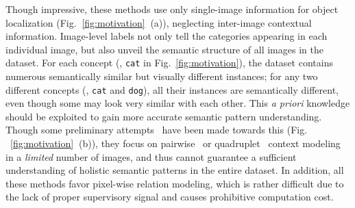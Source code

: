 \documentclass[10pt,twocolumn,letterpaper]{article}
\begin{document}
Though impressive, these methods use only single-image information for object localization (Fig.$_{\!\!}$~\ref{fig:motivation}$_{\!\!}$~(a)), neglecting inter-image contextual information. Image-level labels not only tell the categories appearing in each individual image, but also  unveil the semantic structure  of all images in the dataset. For each concept (\ie, \texttt{cat} in Fig.~\ref{fig:motivation}), the dataset contains numerous semantically similar but visually different instances; for any two different concepts (\eg, \texttt{cat} and \texttt{dog}), all their instances are semantically different, even though some may look very similar with each other. This \textit{a priori} knowledge should be exploited to gain more accurate semantic pattern understanding.
Though some preliminary attempts~\cite{fan2020cian,zhang2020inter,sun2020mining,zhou2021group} have been made towards this (Fig.$_{\!\!}$~\ref{fig:motivation}$_{\!\!}$~(b)), they focus on  pairwise~\cite{fan2020cian,zhang2020inter,sun2020mining} or quadruplet~\cite{zhou2021group} context modeling in a \textit{limited} number of images, and thus cannot guarantee a sufficient understanding of holistic semantic patterns in the entire dataset. In addition, all these methods favor pixel-wise relation modeling, which is rather difficult due to the lack of proper supervisory signal and causes prohibitive computation cost.
\end{document}

